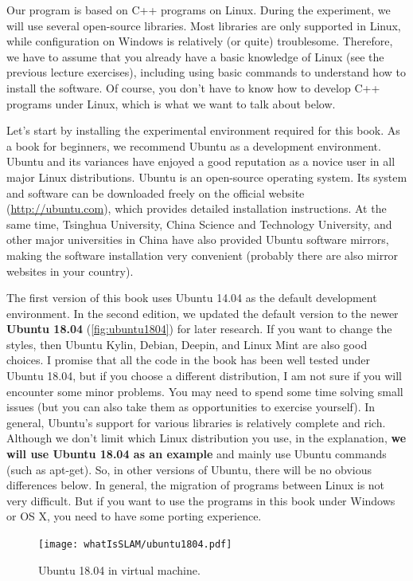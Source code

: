 Our program is based on C++ programs on Linux. During the experiment, we will use several open-source libraries. Most libraries are only supported in Linux, while configuration on Windows is relatively (or quite) troublesome. Therefore, we have to assume that you already have a basic knowledge of Linux (see the previous lecture exercises), including using basic commands to understand how to install the software. Of course, you don't have to know how to develop C++ programs under Linux, which is what we want to talk about below.

Let's start by installing the experimental environment required for this book. As a book for beginners, we recommend Ubuntu as a development environment. Ubuntu and its variances have enjoyed a good reputation as a novice user in all major Linux distributions. Ubuntu is an open-source operating system. Its system and software can be downloaded freely on the official website (\url{http://ubuntu.com}), which provides detailed installation instructions. At the same time, Tsinghua University, China Science and Technology University, and other major universities in China have also provided Ubuntu software mirrors, making the software installation very convenient (probably there are also mirror websites in your country).

The first version of this book uses Ubuntu 14.04 as the default development environment. In the second edition, we updated the default version to the newer \textbf{Ubuntu 18.04} (\autoref{fig:ubuntu1804}) for later research. If you want to change the styles, then Ubuntu Kylin, Debian, Deepin, and Linux Mint are also good choices. I promise that all the code in the book has been well tested under Ubuntu 18.04, but if you choose a different distribution, I am not sure if you will encounter some minor problems. You may need to spend some time solving small issues (but you can also take them as opportunities to exercise yourself). In general, Ubuntu's support for various libraries is relatively complete and rich. Although we don't limit which Linux distribution you use, in the explanation, \textbf{we will use Ubuntu 18.04 as an example} and mainly use Ubuntu commands (such as apt-get). So, in other versions of Ubuntu, there will be no obvious differences below. In general, the migration of programs between Linux is not very difficult. But if you want to use the programs in this book under Windows or OS X, you need to have some porting experience.

\begin{figure}[!ht]
    \centering
    \texttt{[image: whatIsSLAM/ubuntu1804.pdf]}
    \caption{Ubuntu 18.04 in virtual machine.}
    \label{fig:ubuntu1804}
\end{figure}

